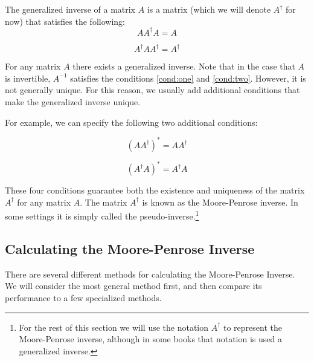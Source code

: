 
 
The generalized inverse of a matrix $A$ is a matrix (which we will denote $A^\dagger$ for now) that satisfies the following:
\begin{equation} \label{cond:one}
AA^\dagger A = A 
\end{equation}

\begin{equation} \label{cond:two}
A^\dagger A A^\dagger = A^\dagger 
\end{equation}

For any matrix $A$ there exists a generalized inverse. Note that in the case that $A$ is invertible, $A^{-1}$ satisfies the conditions \ref{cond:one} and \ref{cond:two}. However, it is not generally unique. For this reason, we usually add additional conditions that make the generalized inverse unique.

For example, we can specify the following two additional conditions:

\begin{equation} \label{cond:three}
(AA^\dagger)^* = AA^\dagger
\end{equation}

\begin{equation} \label{cond:four}
(A^\dagger A)^* = A^\dagger A
\end{equation}

These four conditions guarantee both the existence and uniqueness of the matrix $A^\dagger$ for any matrix $A$. The matrix $A^\dagger$ is known as the Moore-Penrose inverse. In some settings it is simply called the pseudo-inverse.\footnote{For the rest of this section we will use the notation $A^\dagger$ to represent the Moore-Penrose inverse, although in some books that notation is used a generalized inverse.}


\subsection{Calculating the Moore-Penrose Inverse}

There are several different methods for calculating the Moore-Penrose Inverse. We will consider the most general method first, and then compare its performance to a few specialized methods.

